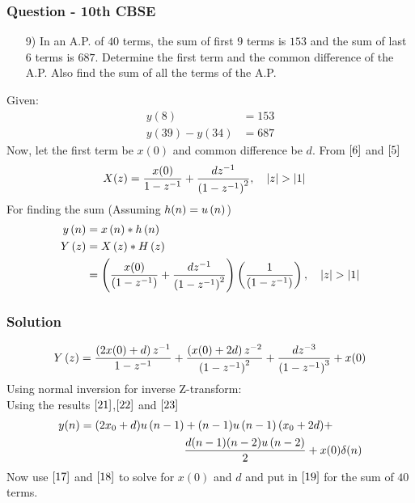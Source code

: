 \documentclass{beamer}
\begin{document}
\begin{frame}
\frametitle{Question - 10th CBSE}
\begin{enumerate}
    \item [9)]
In an A.P. of $40$ terms, the sum of first $9$ terms is $153$ and the sum of last $6$ terms is $687$. Determine the first term and the common difference of the A.P. Also find the sum of all the terms of the A.P. 
\end{enumerate}
\end{frame}
Given:
\begin{align}
y(8) &= 153 \label{17}\\
y(39)-y(34) &= 687 \label{18}
\end{align}
Now, let the first term be $x(0)$ and common difference be $d$. From $\eqref{6}$ and $\eqref{5}$
\begin{align}
    X(z) &= \dfrac{x(0)}{1-z^{-1}} + \dfrac{dz^{-1}}{\left(1-z^{-1}\right)^2} ,\quad \left\vert z\right\vert>\left\vert1\right\vert 
\end{align}
For finding the sum (Assuming $h(n)=u\left(n\right)$)
\begin{align}
    y\left(n\right) &= x\left(n\right) * h\left(n\right)\\
Y\left(z\right) &= X\left(z\right) * H\left(z\right)\\
&= \left(\frac{x(0)}{\left(1-z^{-1}\right)} +
\frac{dz^{-1}}{\left(1-z^{-1}\right)^{2}}\right)\left(\frac{1}{\left(1-z^{-1}\right)}\right)
,\quad \left\vert z\right\vert>\left\vert1\right\vert     
\end{align}







\begin{frame}
\frametitle{Solution}
\begin{align}
 Y\left(z\right)   = \frac{\left(2x(0)+d\right)z^{-1}}{1-z^{-1}} + \frac{\left(x(0)+2d\right)z^{-2}}{\left(1-z^{-1}\right)^2} + \frac{dz^{-3}}{\left(1-z^{-1}\right)^{3}} + x(0)
\end{align}
Using normal inversion for inverse Z-transform:\\
Using the results $\eqref{21}$,$\eqref{22}$ and $\eqref{23}$
\begin{align}
   y(n) = (2x_0+d)u\left(n-1\right) &+ (n-1)u\left(n-1\right)(x_0+2d) + \notag\\
    &\frac{d(n-1)(n-2)u\left(n-2\right)}{2} + x(0)\delta(n)
\end{align}
Now use $\eqref{17}$ and $\eqref{18}$ to solve for $x(0)$ and $d$ and put in $\eqref{19}$ for the sum of $40$ terms.
\end{frame}
\end{document}
